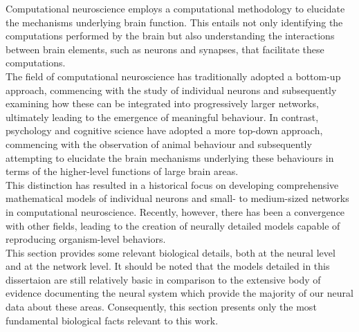 Computational neuroscience employs a computational methodology to elucidate the mechanisms underlying brain function. This entails not only identifying the computations performed by the brain but also understanding the interactions between brain elements, such as neurons and synapses, that facilitate these computations.\\

\noindent The field of computational neuroscience has traditionally adopted a bottom-up approach, commencing with the study of individual neurons and subsequently examining how these can be integrated into progressively larger networks, ultimately leading to the emergence of meaningful behaviour. In contrast, psychology and cognitive science have adopted a more top-down approach, commencing with the observation of animal behaviour and subsequently attempting to elucidate the brain mechanisms underlying these behaviours in terms of the higher-level functions of large brain areas. \\

\noindent This distinction has resulted in a historical focus on developing comprehensive mathematical models of individual neurons and small- to medium-sized networks in computational neuroscience. Recently, however, there has been a convergence with other fields, leading to the creation of neurally detailed models capable of reproducing organism-level behaviors. \\

\noindent This section provides some relevant biological details, both at the neural level and at the network level. It should be noted that the models detailed in this dissertaion are still relatively basic in comparison to the extensive body of evidence documenting the neural system \cite{kandel2000principles} which provide the majority of our neural data about these areas. Consequently, this section presents only the most fundamental biological facts relevant to this work.\\

